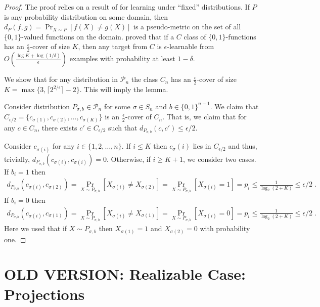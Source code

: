 \documentclass[12pt]{article}
\renewcommand{\P}{\mathcal{P}}
\begin{document}
\begin{proof}
The proof relies on a result of \cite{Benedek-Itai-1991} for learning under
``fixed'' distributions. If $P$ is any probability distribution on some domain,
then $d_P(f,g) = \Pr_{X \sim P}[f(X) \neq g(X)]$ is a pseudo-metric on the set of all
$\{0,1\}$-valued functions on the domain. \cite{Benedek-Itai-1991} proved that
if a $C$ class of $\{0,1\}$-functions has an $\frac{\epsilon}{2}$-cover of size
$K$, then any target from $C$ is $\epsilon$-learnable from $O
\left( \frac{\log K + \log (1/\delta)}{\epsilon}\right)$ examples
with probability at least $1-\delta$.

We show that for any distribution in $\P_n$ the class $C_n$ has an $\frac{\epsilon}{2}$-cover of size
$K = \max\{3, \lceil 2^{2/\epsilon}\rceil  - 2 \}$. This will imply the lemma.

Consider distribution $P_{\sigma,b} \in \P_n$ for some $\sigma \in S_n$ and $b
\in \{0,1\}^{n-1}$. We claim that $C_{\epsilon/2} = \{ c_{\sigma(1)},
c_{\sigma(2)}, \dots, c_{\sigma(K)}\}$ is an $\frac{\epsilon}{2}$-cover of
$C_n$. That is, we claim that for any $c \in C_n$, there exists $c' \in
C_{\epsilon/2}$ such that $d_{P_{\sigma,b}}(c,c') \le \epsilon/2$.

Consider $c_{\sigma(i)}$ for any $i \in \{1,2,\dots,n\}$. If $i \le K$
then $c_\sigma(i)$ lies in $C_{\epsilon/2}$ and thus, trivially, $d_{P_{\sigma,b}}(c_{\sigma(i)},c_{\sigma(i)}) = 0$.
Otherwise, if  $i \ge K + 1$, we consider two cases. If $b_i = 1$ then
\begin{align*}
d_{P_{\sigma,b}}(c_{\sigma(i)},c_{\sigma(2)})
= \Pr_{X \sim P_{\sigma,b}}[X_{\sigma(i)} \neq X_{\sigma(2)} ]
= \Pr_{X \sim P_{\sigma,b}}[X_{\sigma(i)} = 1 ]
= p_i \le \frac{1}{\log_2(2 + K)}
\le \epsilon/2 \; .
\end{align*}
If $b_i = 0$ then
\begin{align*}
d_{P_{\sigma,b}}(c_{\sigma(i)},c_{\sigma(1)})
= \Pr_{X \sim P_{\sigma,b}}[X_{\sigma(i)} \neq X_{\sigma(1)} ]
= \Pr_{X \sim P_{\sigma,b}}[X_{\sigma(i)} = 0 ]
= p_i \le \frac{1}{\log_2(2 + K)}
\le \epsilon/2 \; .
\end{align*}
Here we used that if $X \sim P_{\sigma,b}$
then $X_{\sigma(1)} = 1$ and $X_{\sigma(2)} = 0$ with probability one.
\end{proof}



\section{OLD VERSION: Realizable Case: Projections}
\end{document}
